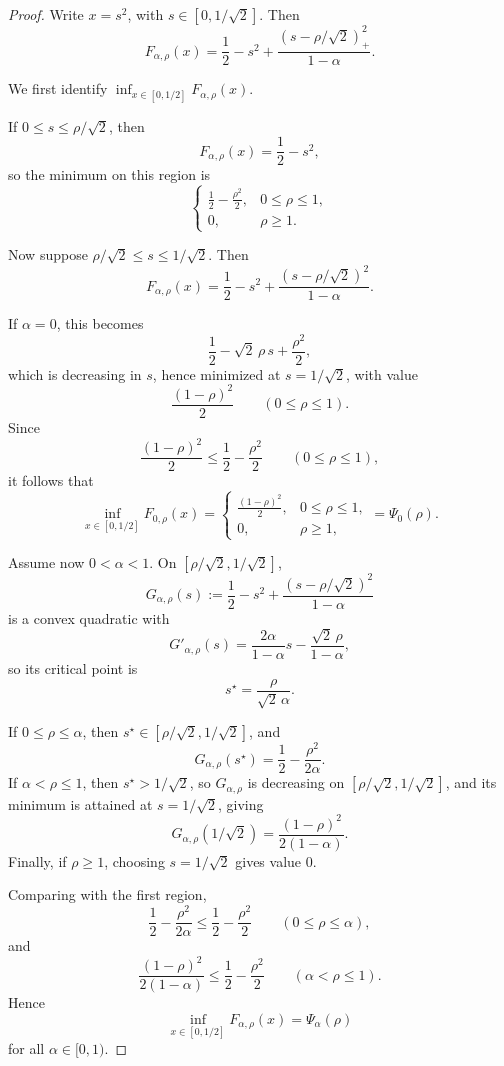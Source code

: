 \documentclass[10pt,a4paper]{amsart}
\begin{document}
\begin{proof}
Write \(x=s^2\), with \(s\in[0,1/\sqrt2]\). Then
\[
F_{\alpha,\rho}(x)
=
\frac12-s^2+\frac{(s-\rho/\sqrt2)_+^2}{1-\alpha}.
\]

We first identify \(\inf_{x\in[0,1/2]}F_{\alpha,\rho}(x)\).

If \(0\le s\le \rho/\sqrt2\), then
\[
F_{\alpha,\rho}(x)=\frac12-s^2,
\]
so the minimum on this region is
\[
\begin{cases}
\frac12-\frac{\rho^2}{2}, & 0\le \rho\le 1,\\[1ex]
0, & \rho\ge 1.
\end{cases}
\]

Now suppose \(\rho/\sqrt2\le s\le 1/\sqrt2\). Then
\[
F_{\alpha,\rho}(x)
=
\frac12-s^2+\frac{(s-\rho/\sqrt2)^2}{1-\alpha}.
\]

If \(\alpha=0\), this becomes
\[
\frac12-\sqrt2\,\rho\,s+\frac{\rho^2}{2},
\]
which is decreasing in \(s\), hence minimized at \(s=1/\sqrt2\), with value
\[
\frac{(1-\rho)^2}{2}
\qquad (0\le \rho\le 1).
\]
Since
\[
\frac{(1-\rho)^2}{2}\le \frac12-\frac{\rho^2}{2}
\qquad (0\le \rho\le 1),
\]
it follows that
\[
\inf_{x\in[0,1/2]}F_{0,\rho}(x)
=
\begin{cases}
\frac{(1-\rho)^2}{2}, & 0\le \rho\le 1,\\[1ex]
0, & \rho\ge 1,
\end{cases}
=
\Psi_0(\rho).
\]

Assume now \(0<\alpha<1\). On \([\rho/\sqrt2,1/\sqrt2]\),
\[
G_{\alpha,\rho}(s):=
\frac12-s^2+\frac{(s-\rho/\sqrt2)^2}{1-\alpha}
\]
is a convex quadratic with
\[
G'_{\alpha,\rho}(s)=\frac{2\alpha}{1-\alpha}s-\frac{\sqrt2\,\rho}{1-\alpha},
\]
so its critical point is
\[
s^\star=\frac{\rho}{\sqrt2\,\alpha}.
\]

If \(0\le \rho\le \alpha\), then \(s^\star\in[\rho/\sqrt2,1/\sqrt2]\), and
\[
G_{\alpha,\rho}(s^\star)=\frac12-\frac{\rho^2}{2\alpha}.
\]
If \(\alpha<\rho\le 1\), then \(s^\star>1/\sqrt2\), so \(G_{\alpha,\rho}\) is decreasing on \([\rho/\sqrt2,1/\sqrt2]\), and its minimum is attained at \(s=1/\sqrt2\), giving
\[
G_{\alpha,\rho}(1/\sqrt2)=\frac{(1-\rho)^2}{2(1-\alpha)}.
\]
Finally, if \(\rho\ge 1\), choosing \(s=1/\sqrt2\) gives value \(0\).

Comparing with the first region,
\[
\frac12-\frac{\rho^2}{2\alpha}\le \frac12-\frac{\rho^2}{2}
\qquad (0\le \rho\le \alpha),
\]
and
\[
\frac{(1-\rho)^2}{2(1-\alpha)}\le \frac12-\frac{\rho^2}{2}
\qquad (\alpha<\rho\le 1).
\]
Hence
\[
\inf_{x\in[0,1/2]}F_{\alpha,\rho}(x)=\Psi_\alpha(\rho)
\]
for all \(\alpha\in[0,1)\).


\end{proof}
\end{document}
